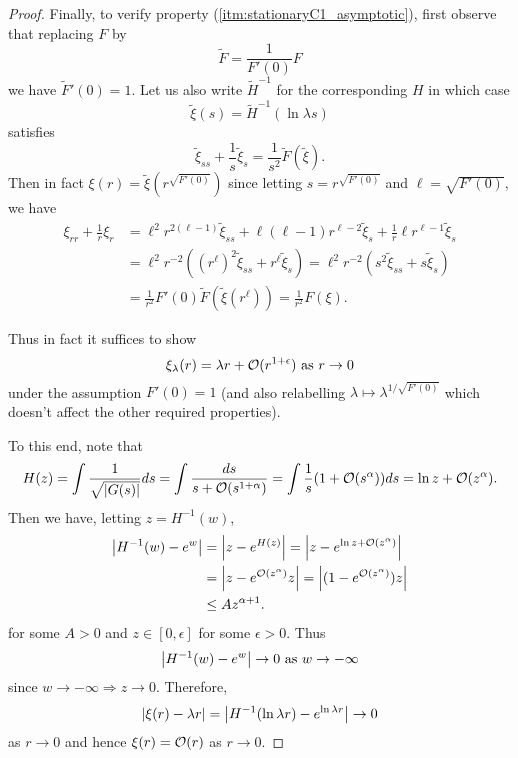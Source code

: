 \documentclass{amsart}
\begin{document}
\begin{proof}
Finally, to verify property (\ref{itm:stationaryC1_asymptotic}), first observe that replacing \(F\) by
\[
\tilde{F} = \frac{1}{F'(0)} F
\]
we have \(\tilde{F}'(0) = 1\). Let us also write \(\tilde{H}^{-1}\) for the corresponding \(H\) in which case
\[
\tilde{\xi}(s) = \tilde{H}^{-1} (\ln \lambda s)
\]
satisfies
\[
\tilde{\xi}_{ss} + \frac{1}{s} \tilde{\xi}_s = \frac{1}{s^2} \tilde{F}(\tilde{\xi}).
\]
Then in fact \(\xi(r) = \tilde{\xi}(r^{\sqrt{F'(0)}})\) since letting \(s = r^{\sqrt{F'(0)}}\) and \(\ell = \sqrt{F'(0)}\), we have
\[
\begin{split}
\xi_{rr} + \frac{1}{r} \xi_r &= \ell^2 r^{2(\ell - 1)} \tilde{\xi}_{ss} + \ell (\ell - 1) r^{\ell - 2} \tilde{\xi}_s + \frac{1}{r} \ell r^{\ell - 1} \tilde{\xi}_s \\
&= \ell^2 r^{-2} \left((r^{\ell})^2\tilde{\xi}_{ss} + r^{\ell} \tilde{\xi}_s\right) = \ell^2 r^{-2} \left(s^2 \tilde{\xi}_{ss} + s \tilde{\xi}_s\right) \\
&= \frac{1}{r^2} F'(0) \tilde{F}(\tilde{\xi}(r^{\ell})) = \frac{1}{r^2} F(\xi).
\end{split}
\]

Thus in fact it suffices to show
\[
\xi_{\lambda} (r) = \lambda r + \operatorname{\mathcal{O}}(r^{1 + \epsilon}) \text{ as } r \to 0
\]
under the assumption \(F'(0) = 1\) (and also relabelling \(\lambda \mapsto \lambda^{1/\sqrt{F'(0)}}\) which doesn't affect the other required properties).

To this end, note that
\[
H(z) = \int \frac{1}{\sqrt{|G(s)|}} ds = \int \frac{ds}{s + \operatorname{\mathcal{O}}(s^{1+\alpha})} = \int \frac{1}{s}(1 + \operatorname{\mathcal{O}}(s^{\alpha})) ds = \ln z + \operatorname{\mathcal{O}}(z^{\alpha}).
\]
Then we have, letting \(z = H^{-1}(w)\),
\[
\begin{split}
\left|{H^{-1}(w) - e^w}\right| &= \left|{z - e^{H(z)}}\right| = \left|{z - e^{\ln z + \operatorname{\mathcal{O}}(z^{\alpha})}}\right| \\
&= \left|{z - e^{\operatorname{\mathcal{O}}(z^{\alpha})} z}\right| = \left|{(1 - e^{\operatorname{\mathcal{O}}(z^{\alpha})})z}\right| \\
&\leq A z^{\alpha+1}.
\end{split}
\]
for some \(A > 0\) and \(z \in [0, \epsilon]\) for some \(\epsilon > 0\). Thus
\[
\left|{H^{-1}(w) - e^w}\right| \to 0 \text{ as } w \to -\infty
\]
since \(w \to -\infty \Rightarrow z \to 0\). Therefore,
\[
\left|{\xi(r) - \lambda r}\right| = \left|{H^{-1} (\ln \lambda r) - e^{\ln \lambda r}}\right| \to 0
\]
as \(r \to 0\) and hence \(\xi(r) = \operatorname{\mathcal{O}}(r)\) as \(r \to 0\).
\end{proof}
\end{document}

